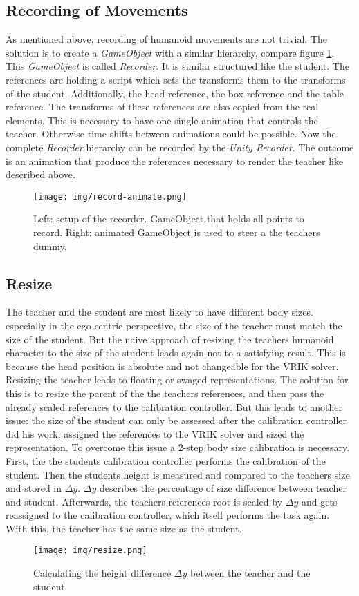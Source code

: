 \subsection{Recording of Movements}
As mentioned above, recording of humanoid movements are not trivial. The solution is to create a \textit{GameObject} with a similar hierarchy, compare figure \ref{fig:record_animation}. This \textit{GameObject} is called \textit{Recorder}. It is similar structured like the student. The references are holding a script which sets the transforms them to the transforms of the student. Additionally, the head reference, the box reference and the table reference. The transforms of these references are also copied from the real elements. This is necessary to have one single animation that controls the teacher. Otherwise time shifts between animations could be possible. Now the complete \textit{Recorder} hierarchy can be recorded by the \textit{Unity Recorder}. The outcome is an animation that produce the references necessary to render the teacher like described above.
\begin{figure}
	\centering
	\texttt{[image: img/record-animate.png]}
	\caption{Left: setup of the recorder. GameObject that holds all points to record. Right: animated GameObject is used to steer a the teachers dummy.}
	\label{fig:record_animation}
\end{figure}
\subsection{Resize}
The teacher and the student are most likely to have different body sizes. especially in the ego-centric perspective, the size of the teacher must match the size of the student. But the naive approach of resizing the teachers humanoid character to the size of the student leads again not to a satisfying result. This is because the head position is absolute and not changeable for the VRIK solver. Resizing the teacher leads to floating or swaged representations. The solution for this is to resize the parent of the the teachers references, and then pass the already scaled references to the calibration controller. But this leads to another issue: the size of the student can only be assessed after the calibration controller did his work, assigned the references to the VRIK solver and sized the representation. To overcome this issue a 2-step body size calibration is necessary. First, the the students calibration controller performs the calibration of the student. Then the students height is measured and compared to the teachers size and stored in $\Delta y$. $\Delta y$ describes the percentage of size difference between teacher and student. Afterwards, the teachers references root is scaled by $\Delta y$ and gets reassigned to the calibration controller, which itself performs the task again. With this, the teacher has the same size as the student.
\begin{figure}
	\centering
	\texttt{[image: img/resize.png]}
	\caption{Calculating the height difference $\Delta y$ between the teacher and the student.}
	\label{fig:resize}
\end{figure}


